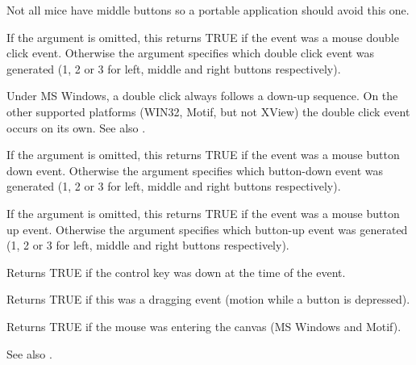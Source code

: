 Not all mice have middle buttons so a portable application should avoid
this one.

\label{buttondclick}


If the argument is omitted, this returns TRUE if the event was a mouse
double click event. Otherwise the argument specifies which double click event
was generated (1, 2 or 3 for left, middle and right buttons respectively).

Under MS Windows, a double click always follows a down-up sequence. On
the other supported platforms (WIN32, Motif, but not XView) the double click
event occurs on its own. See also .



If the argument is omitted, this returns TRUE if the event was a mouse
button down event. Otherwise the argument specifies which button-down event
was generated (1, 2 or 3 for left, middle and right buttons respectively).



If the argument is omitted, this returns TRUE if the event was a mouse
button up event. Otherwise the argument specifies which button-up event
was generated (1, 2 or 3 for left, middle and right buttons respectively).



Returns TRUE if the control key was down at the time of the event.



Returns TRUE if this was a dragging event (motion while a button is depressed).

\label{entering}


Returns TRUE if the mouse was entering the canvas (MS Windows and Motif).

See also .

